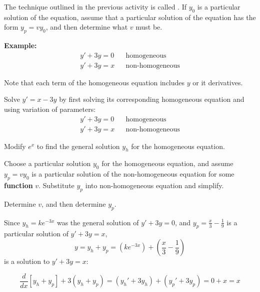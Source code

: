 \begin{applicationActivities}
\begin{observation}
The technique outlined in the previous activity is called .  
If \(y_0\) is a particular solution of the  equation, 
assume that a particular solution of the 
 equation has the form \(y_p = v y_0\), and then determine what \(v\) must be. 

\vfill

\textbf{Example: }
\begin{align*}
y'+3y = 0 & & \text{homogeneous} \\
y'+3y = x & & \text{non-homogeneous}
\end{align*}

Note that each term of the homogeneous equation includes \(y\) or it derivatives.
\end{observation}

\begin{activity}{20}
Solve \(y'=x-3y\) by first solving its corresponding homogeneous equation and using
variation of parameters: 
\begin{align*}
y'+3y = 0 & & \text{homogeneous} \\
y'+3y = x & & \text{non-homogeneous}
\end{align*}
\begin{subactivity}
Modify \(e^x\) to find the general solution \(y_h\) for the homogeneous equation.
\end{subactivity}
\begin{subactivity}
Choose a particular solution \(y_0\) for the homogeneous equation, and
assume \(y_p = v y_0 \) is a particular solution of the non-homogeneous equation for some \textbf{function} \(v\).
Substitute \(y_p\) into non-homogeneous equation and simplify.
\end{subactivity}
\begin{subactivity}
Determine \(v\), and then determine \(y_p\).
\end{subactivity}
\end{activity}

\begin{observation}
Since \(y_h=ke^{-3x}\) was the general solution of \(y'+3y=0\), 
and \(y_p = \frac{x}{3}-\frac{1}{9}\) is a particular solution of \(y'+3y=x\), 
\[y=y_h+y_p = \left(ke^{-3x}\right)+\left(\frac{x}{3}-\frac{1}{9}\right)\]
is a solution to \(y'+3y=x\):

\vfill

\[\frac{d}{dx}[y_h+y_p]+3(y_h+y_p)=(y_h'+3y_h)+(y_p'+3y_p)=0+x=x\]
\end{observation}


\end{applicationActivities}
